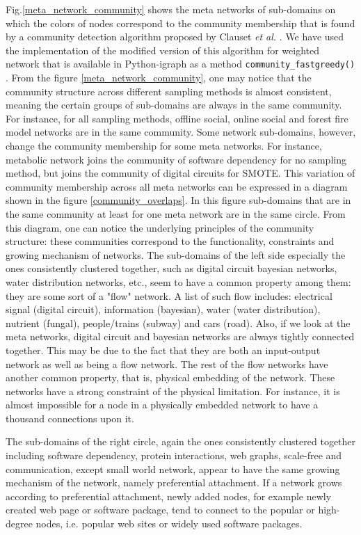 \documentclass{article}
\begin{document}
Fig.\ref{meta_network_community} shows the meta networks of sub-domains on which the colors of nodes correspond to the community membership that is found by a community detection algorithm proposed by Clauset \textit{et al.} \cite{CNMAlgorithm}. We have used the implementation of the modified version of this algorithm for weighted network that is available in Python-igraph as a method \texttt{community\_fastgreedy()} \cite{igraph}. From the figure \ref{meta_network_community}, one may notice that the community structure across different sampling methods is almost consistent, meaning the certain groups of sub-domains are always in the same community.  For instance, for all sampling methods, offline social, online social and forest fire model networks are in the same community. Some network sub-domains, however, change the community membership for some meta networks. For instance, metabolic network joins the community of software dependency for no sampling method, but joins the community of digital circuits for SMOTE. This variation of community membership across all meta networks can be expressed in a diagram shown in the figure \ref{community_overlaps}. In this figure sub-domains that are in the same community at least for one meta network are in the same circle. From this diagram, one can notice the underlying principles of the community structure: these communities correspond to the functionality, constraints and growing mechanism of networks. The sub-domains of the left side especially the ones consistently clustered together, such as digital circuit bayesian networks, water distribution networks, etc., seem to have a common property among them: they are some sort of a "flow" network. A list of such flow includes: electrical signal (digital circuit), information (bayesian), water (water distribution), nutrient (fungal), people/trains (subway) and cars (road). Also, if we look at the meta networks, digital circuit and bayesian networks are always tightly connected together. This may be due to the fact that they are both an input-output network as well as being a flow network. The rest of the flow networks have another common property, that is, physical embedding of the network. These networks have a strong constraint of the physical limitation. For instance, it is almost impossible for a node in a physically embedded network to have a thousand connections upon it.

The sub-domains of the right circle, again the ones consistently clustered together including software dependency, protein interactions, web graphs, scale-free and communication, except small world network, appear to have the same growing mechanism of the network, namely preferential attachment. If a network grows according to preferential attachment, newly added nodes, for example newly created web page or software package, tend to connect to the popular or high-degree nodes, i.e. popular web sites or widely used software packages. 
\end{document}
